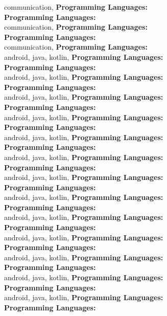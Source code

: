 communication, \textbf{Programming Languages:} \\
\textbf{Programming Languages:} \\
communication, \textbf{Programming Languages:} \\
\textbf{Programming Languages:} \\
communication, \textbf{Programming Languages:} \\
android, java, kotlin, \textbf{Programming Languages:} \\
\textbf{Programming Languages:} \\
android, java, kotlin, \textbf{Programming Languages:} \\
\textbf{Programming Languages:} \\
android, java, kotlin, \textbf{Programming Languages:} \\
\textbf{Programming Languages:} \\
android, java, kotlin, \textbf{Programming Languages:} \\
\textbf{Programming Languages:} \\
android, java, kotlin, \textbf{Programming Languages:} \\
\textbf{Programming Languages:} \\
android, java, kotlin, \textbf{Programming Languages:} \\
\textbf{Programming Languages:} \\
android, java, kotlin, \textbf{Programming Languages:} \\
\textbf{Programming Languages:} \\
android, java, kotlin, \textbf{Programming Languages:} \\
\textbf{Programming Languages:} \\
android, java, kotlin, \textbf{Programming Languages:} \\
\textbf{Programming Languages:} \\
android, java, kotlin, \textbf{Programming Languages:} \\
\textbf{Programming Languages:} \\
android, java, kotlin, \textbf{Programming Languages:} \\
\textbf{Programming Languages:} \\
android, java, kotlin, \textbf{Programming Languages:} \\
\textbf{Programming Languages:} \\
android, java, kotlin, \textbf{Programming Languages:} \\
\textbf{Programming Languages:} \\
